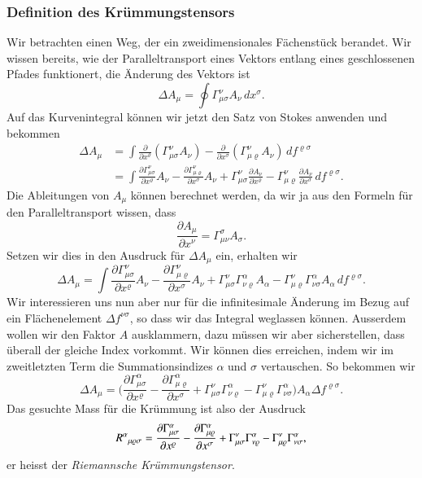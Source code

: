 \subsubsection{Definition des Krümmungstensors}
Wir betrachten einen Weg, der ein zweidimensionales Fächenstück berandet.
Wir wissen bereits, wie der Paralleltransport eines Vektors entlang
eines geschlossenen Pfades funktionert, die Änderung des Vektors ist
\[
\Delta A_\mu
= 
\oint \Gamma_{\mu\sigma}^\nu A_\nu\,dx^\sigma.
\]
Auf das Kurvenintegral können wir jetzt den Satz von Stokes anwenden
und bekommen
\begin{align*}
\Delta A_\mu
&=
\int
\frac{\partial}{\partial x^\varrho}
(\Gamma_{\mu\sigma}^\nu A_\nu)
-
\frac{\partial}{\partial x^\sigma}
(\Gamma_{\mu\varrho}^\nu A_\nu)
\,df^{\varrho\sigma}
\\
&=\int
\frac{\partial \Gamma_{\mu\sigma}^\nu}{\partial x^\varrho}A_\nu
-
\frac{\partial \Gamma_{\mu\varrho}^\nu}{\partial x^\sigma}A_\nu
+
\Gamma_{\mu\sigma}^\nu
\frac{\partial A_\nu}{\partial x^\varrho}
-
\Gamma_{\mu\varrho}^\nu
\frac{\partial A_\nu}{\partial x^\sigma}
\,df^{\varrho\sigma}.
\end{align*}
Die Ableitungen von $A_\mu$ können berechnet werden, da wir ja aus
den Formeln für den Paralleltransport wissen, dass
\[
\frac{\partial A_\mu}{\partial x^\nu}=\Gamma^{\sigma}_{\mu\nu}A_\sigma.
\]
Setzen wir dies in den Ausdruck für $\Delta A_\mu$ ein, erhalten
wir
\begin{equation}
\Delta A_\mu
=\int
\frac{\partial \Gamma_{\mu\sigma}^\nu}{\partial x^\varrho}A_\nu
-
\frac{\partial \Gamma_{\mu\varrho}^\nu}{\partial x^\sigma}A_\nu
+
\Gamma_{\mu\sigma}^\nu
\Gamma_{\nu\varrho}^\alpha
A_\alpha
-
\Gamma_{\mu\varrho}^\nu
\Gamma_{\nu\sigma}^\alpha
A_\alpha
\,df^{\varrho\sigma}.
\end{equation}
Wir interessieren uns nun aber nur für die infinitesimale Änderung
im Bezug auf ein Flächenelement $\Delta f^{\nu\sigma}$, so dass wir
das Integral weglassen können.
Ausserdem wollen wir den Faktor $A$ ausklammern, dazu müssen wir aber
sicherstellen, dass überall der gleiche Index vorkommt.
Wir können dies erreichen, indem wir im zweitletzten Term die
Summationsindizes $\alpha$ und $\sigma$ vertauschen.
So bekommen wir
\[
\Delta A_\mu
=
\biggl(
\frac{\partial \Gamma_{\mu\sigma}^\alpha}{\partial x^\varrho}
-
\frac{\partial \Gamma_{\mu\varrho}^\alpha}{\partial x^\sigma}
+
\Gamma_{\mu\sigma}^\nu
\Gamma_{\nu\varrho}^\alpha
-
\Gamma_{\mu\varrho}^\nu
\Gamma_{\nu\sigma}^\alpha
\biggr)
A_\alpha
\Delta f^{\varrho\sigma}.
\]
Das gesuchte Mass für die Krümmung ist also der Ausdruck
\begin{equation}
R^\alpha\mathstrut_{\mu\varrho\sigma}
=
\frac{\partial \Gamma_{\mu\sigma}^\alpha}{\partial x^\varrho}
-
\frac{\partial \Gamma_{\mu\varrho}^\alpha}{\partial x^\sigma}
+
\Gamma_{\mu\sigma}^\nu
\Gamma_{\nu\varrho}^\alpha
-
\Gamma_{\mu\varrho}^\nu
\Gamma_{\nu\sigma}^\alpha,
\label{skript:kruemmung:riemannmixed}
\end{equation}
er heisst der {\em Riemannsche Krümmungstensor}.
%
%

